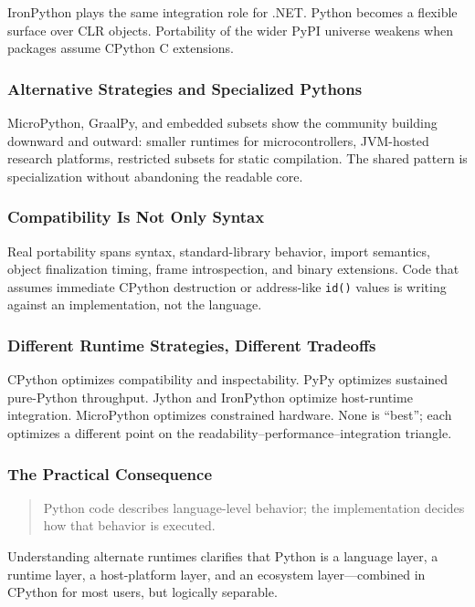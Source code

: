 IronPython plays the same integration role for .NET. Python becomes a flexible surface over CLR objects. Portability of the wider PyPI universe weakens when packages assume CPython C extensions.

\subsubsection{Alternative Strategies and Specialized Pythons}

MicroPython, GraalPy, and embedded subsets show the community building downward and outward: smaller runtimes for microcontrollers, JVM-hosted research platforms, restricted subsets for static compilation. The shared pattern is specialization without abandoning the readable core.

\subsubsection{Compatibility Is Not Only Syntax}

Real portability spans syntax, standard-library behavior, import semantics, object finalization timing, frame introspection, and binary extensions. Code that assumes immediate CPython destruction or address-like \texttt{id()} values is writing against an implementation, not the language.

\subsubsection{Different Runtime Strategies, Different Tradeoffs}

CPython optimizes compatibility and inspectability. PyPy optimizes sustained pure-Python throughput. Jython and IronPython optimize host-runtime integration. MicroPython optimizes constrained hardware. None is ``best''; each optimizes a different point on the readability--performance--integration triangle.

\subsubsection{The Practical Consequence}

\begin{quote}
Python code describes language-level behavior; the implementation decides how that behavior is executed.
\end{quote}

Understanding alternate runtimes clarifies that Python is a language layer, a runtime layer, a host-platform layer, and an ecosystem layer---combined in CPython for most users, but logically separable.
